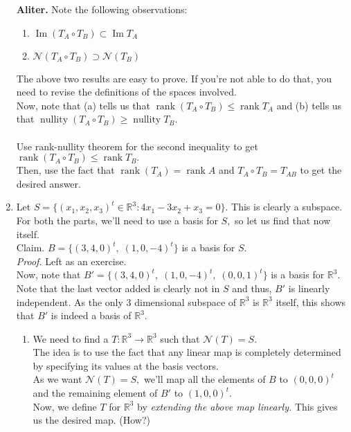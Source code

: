 \documentclass{article}
\newcommand{\rank}{\operatorname{rank}}
\renewcommand{\Im}{\operatorname{Im}}
\newcommand{\nullity}{\operatorname{nullity}}
\begin{document}
\begin{enumerate}
	\hrulefill

	\textbf{Aliter.} Note the following observations:
	\begin{enumerate}[nosep] 
		\item $\Im (T_A\circ T_B) \subset \Im T_A$
		\item $\mathcal{N}(T_A\circ T_B) \supset \mathcal{N} (T_B)$
	\end{enumerate}
	The above two results are easy to prove. If you're not able to do that, you need to revise the definitions of the spaces involved.\\
	Now, note that (a) tells us that $\rank (T_A \circ T_B) \le \rank T_A$ and (b) tells us that $\nullity(T_A\circ T_B) \ge \nullity T_B.$\\~\\
	Use rank-nullity theorem for the second inequality to get $\rank(T_A\circ T_B) \le \rank T_B.$\\
	Then, use the fact that $\rank(T_A) = \rank A$ and $T_A\circ T_B = T_{AB}$ to get the desired answer. 
	\item Let $S = \{(x_1, x_2, x_3)^t \in \mathbb{R}^3 : 4x_1 - 3x_2 + x_3 = 0\}.$ This is clearly a subspace.\\
	For both the parts, we'll need to use a basis for $S,$ so let us find that now itself.\\
	Claim. $B = \{(3, 4, 0)^t,\;(1, 0, -4)^t\}$ is a basis for $S.$\\
	\emph{Proof.} Left as an exercise.\\
	Now, note that $B' = \{(3, 4, 0)^t,\;(1, 0, -4)^t,\;(0, 0, 1)^t\}$ is a basis for $\mathbb{R}^3.$\\
	Note that the last vector added is clearly not in $S$ and thus, $B'$ is linearly independent. As the only $3$ dimensional subspace of $\mathbb{R}^3$ is $\mathbb{R}^3$ itself, this shows that $B'$ is indeed a basis of $\mathbb{R}^3.$
	\begin{enumerate} 
		\item We need to find a $T:\mathbb{R}^3\to\mathbb{R}^3$ such that $\mathcal{N}(T) = S.$\\
		The idea is to use the fact that any linear map is completely determined by specifying its values at the basis vectors.\\
		As we want $\mathcal{N}(T) = S,$ we'll map all the elements of $B$ to $(0, 0, 0)^t$ and the remaining element of $B'$ to $(1, 0, 0)^t.$\\
		Now, we define $T$ for $\mathbb{R}^3$ by \emph{extending the above map linearly.}
		This gives us the desired map. \hfill (How?)

\end{enumerate}
\end{enumerate}
\end{document}
